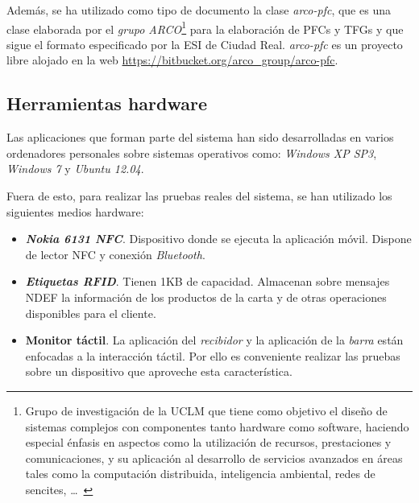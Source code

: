   Además, se ha utilizado como tipo de documento la clase \emph{arco-pfc}, que
  es una clase elaborada por el \emph{grupo \acs{ARCO}}\footnote{Grupo de
  investigación de la \acs{UCLM} que tiene como objetivo el diseño de
  sistemas complejos con componentes tanto hardware como software, haciendo
  especial énfasis en aspectos como la utilización de recursos, prestaciones
  y comunicaciones, y su aplicación al desarrollo de servicios avanzados en
  áreas tales como la computación distribuida, inteligencia ambiental, redes
  de sencites, \dots~\cite{bib:ARCO}} para la elaboración de \acs{PFC}s y
  \acs{TFG}s y que sigue el formato especificado por la \acs{ESI} de Ciudad 
  Real. \emph{arco-pfc} es un proyecto libre alojado en la web
  \url{https://bitbucket.org/arco_group/arco-pfc}.

  \subsection{Herramientas hardware}
  Las aplicaciones que forman parte del sistema han sido desarrolladas en
  varios ordenadores personales sobre sistemas operativos como: \emph{Windows
  XP SP3}, \emph{Windows 7} y \emph{Ubuntu 12.04}.

  Fuera de esto, para realizar las pruebas reales del sistema, se han utilizado
  los siguientes medios hardware:
  \begin{itemize}
  \item \textbf{\emph{Nokia 6131 \acs{NFC}}}. Dispositivo donde se ejecuta
  la aplicación móvil. Dispone de lector \acs{NFC} y conexión \emph{Bluetooth}.
  \item \textbf{\emph{Etiquetas \acs{RFID}}}. Tienen 1KB de capacidad. 
  Almacenan sobre mensajes \acs{NDEF} la información de los productos de la 
  carta y de otras operaciones disponibles para el cliente.
  \item \textbf{Monitor táctil}. La aplicación del \emph{recibidor} y la 
  aplicación de la \emph{barra} están enfocadas a la interacción táctil. Por 
  ello es conveniente realizar las pruebas sobre un dispositivo que aproveche 
  esta característica. %
  \end{itemize}

